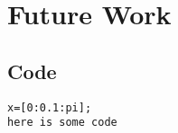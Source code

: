 \chapter[Future Work]{Future Work}
\label{AppendixA}

\section{Code} 

\begin{verbatim}
x=[0:0.1:pi];
here is some code
\end{verbatim}
